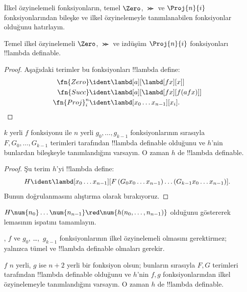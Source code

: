 \documentclass[../../../include/open-logic-section]{subfiles}
\begin{document}

İlkel özyinelemeli fonksiyonların, temel $\Zero$, $\Succ$ ve $\Proj{n}{i}$
fonksiyonlarından bileşke ve ilkel özyinelemeyle tanımlanabilen fonksiyonlar
olduğunu hatırlayın.

\begin{lem}
  Temel ilkel özyinelemeli $\Zero$, $\Succ$ ve izdüşüm $\Proj{n}{i}$
  fonksiyonları !!{lambda definable}.
\end{lem}

\begin{proof}
Aşağıdaki terimler bu fonksiyonları !!{lambda define}:
\begin{align*}
  \fn{Zero} & \ident \lambd[a][\lambd[fx][x]]\\
  \fn{Succ} & \ident \lambd[a][\lambd[fx][f (a f x)]] \\
  \fn{Proj}^n_i & \ident \lambd[x_0\dots x_{n-1}][x_i].
\end{align*}
\end{proof}

\begin{lem}
   $k$ yerli $f$ fonksiyonu ile $n$ yerli
  $g_0,\dots,g_{k-1}$ fonksiyonlarının sırasıyla
  $F,G_0,\dots,G_{k-1}$ terimleri tarafından !!{lambda definable}
  olduğunu ve $h$'nin bunlardan bileşkeyle tanımlandığını varsayın. O zaman
  $h$ de !!{lambda definable}.
\end{lem}

\begin{proof}
  Şu terim $h$'yi !!{lambda define}:
  \[
  H \ident \lambd[x_0 \dots x_{n-1}][F\, (G_0 x_0 \dots
    x_{n-1}) \dots (G_{k-1} x_0 \dots x_{n-1})].
  \]
  Bunun doğrulanmasını alıştırma olarak bırakıyoruz.
\end{proof}

\begin{prob}
  $H\num{n_0}\dots\num{n_{n-1}}\red
  \num{h(n_0,\dots,n_{n-1})}$ olduğunu göstererek
   lemasının ispatını tamamlayın.
\end{prob}

, $f$ ve $g_0$, \dots,~$g_{k-1}$ fonksiyonlarının ilkel
özyinelemeli olmasını gerektirmez; yalnızca tümel ve !!{lambda definable}
olmaları gerekir.

\begin{lem}
  $f$ $n$ yerli, $g$ ise $n+2$ yerli bir fonksiyon olsun; bunların sırasıyla
  $F,G$ terimleri tarafından !!{lambda definable} olduğunu ve $h$'nin $f,g$
  fonksiyonlarından ilkel özyinelemeyle tanımlandığını varsayın. O zaman $h$
  de !!{lambda definable}.
\end{lem}
\end{document}
